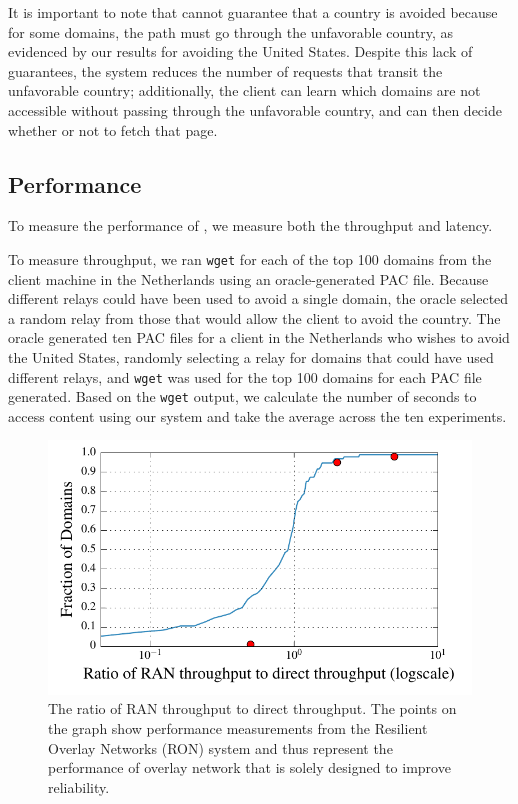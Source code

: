 It is important to note that \system{} cannot guarantee that a country is 
avoided because for some domains, the path must go through the unfavorable 
country, as evidenced by our results for avoiding the United States.  Despite 
this lack of guarantees, the system reduces the number of requests that 
transit the unfavorable country; additionally, the client can learn which domains 
are not accessible without passing through the unfavorable country, and can then 
decide whether or not to fetch that page.  

\subsection{Performance}
To measure the performance of \system{}, we measure both 
the throughput and latency.

To measure throughput, we ran {\tt wget} for each 
of the top 100 domains from the client machine in the Netherlands 
using an oracle-generated PAC file.  Because different relays could have been 
used to avoid a single domain, the oracle selected a random relay from those 
that would allow the client to avoid the country.  The oracle generated 
ten PAC files for a client in the Netherlands who wishes to avoid the United States,
 randomly selecting a relay for domains that could have used 
different relays, and {\tt wget} was used for the top 100 domains for each 
PAC file generated.  Based on the {\tt wget} output, we calculate the number 
of seconds to access content using our system and take the average across the 
ten experiments. 

\begin{figure}[t]
\centering
\includegraphics[width=.5\textwidth]{throughput}
\caption{The ratio of RAN throughput to direct throughput.  
The points on the graph show performance measurements from the Resilient Overlay
Networks (RON) system and thus represent  the performance of overlay network
that is solely designed to improve reliability.} 
\label{fig:throughput}
\end{figure}

